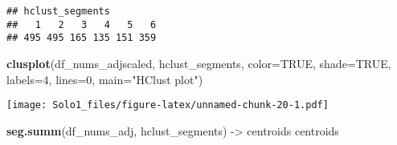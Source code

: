\documentclass[]{article}
\newenvironment{Shaded}{\begin{snugshade}}{\end{snugshade}}
\newcommand{\KeywordTok}[1]{\textcolor[rgb]{0.13,0.29,0.53}{\textbf{#1}}}
\newcommand{\DataTypeTok}[1]{\textcolor[rgb]{0.13,0.29,0.53}{#1}}
\newcommand{\DecValTok}[1]{\textcolor[rgb]{0.00,0.00,0.81}{#1}}
\newcommand{\StringTok}[1]{\textcolor[rgb]{0.31,0.60,0.02}{#1}}
\newcommand{\OtherTok}[1]{\textcolor[rgb]{0.56,0.35,0.01}{#1}}
\newcommand{\NormalTok}[1]{#1}
\begin{document}
\begin{verbatim}
## hclust_segments
##   1   2   3   4   5   6 
## 495 495 165 135 151 359
\end{verbatim}

\begin{Shaded}
\begin{Highlighting}[]
\KeywordTok{clusplot}\NormalTok{(df_nums_adjscaled, hclust_segments, }\DataTypeTok{color=}\OtherTok{TRUE}\NormalTok{, }\DataTypeTok{shade=}\OtherTok{TRUE}\NormalTok{, }\DataTypeTok{labels=}\DecValTok{4}\NormalTok{, }\DataTypeTok{lines=}\DecValTok{0}\NormalTok{, }\DataTypeTok{main=}\StringTok{"HClust plot"}\NormalTok{)}
\end{Highlighting}
\end{Shaded}

\texttt{[image: Solo1\_files/figure-latex/unnamed-chunk-20-1.pdf]}

\begin{Shaded}
\begin{Highlighting}[]
\KeywordTok{seg.summ}\NormalTok{(df_nums_adj, hclust_segments) ->}\StringTok{ }\NormalTok{centroids}
\NormalTok{centroids}
\end{Highlighting}
\end{Shaded}
\end{document}

